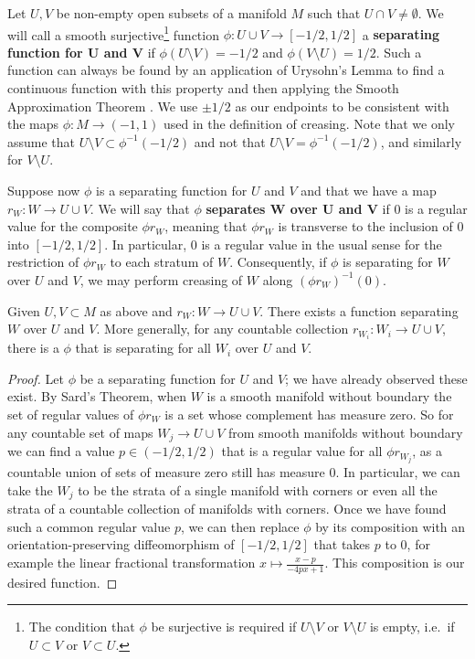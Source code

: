 \begin{definition}
	Let $U,V$ be non-empty open subsets of a manifold $M$ such that $U \cap V \neq \emptyset$.
	We will call a smooth surjective\footnote{The condition that $\phi$ be surjective is required if $U\setminus V$ or $V\setminus U$ is empty, i.e.\ if $U \subset V$ or $V \subset U$.} function $\phi \colon U \cup V \to [-1/2,1/2]$ a \textbf{separating function for $\mathbf U$ and $\mathbf V$} if $\phi(U\setminus V) = -1/2$ and $\phi(V\setminus U) = 1/2$.
	Such a function can always be found by an application of Urysohn's Lemma to find a continuous function with this property and then applying the Smooth Approximation Theorem \cite[Theorem III.2.5]{Kos93}.
	We use $\pm 1/2$ as our endpoints to be consistent with the maps $\phi \colon M \to (-1,1)$ used in the definition of creasing.
	Note that we only assume that $U \setminus V \subset \phi^{-1}(-1/2)$ and not that $U \setminus V  = \phi^{-1}(-1/2)$, and similarly for $V \setminus U$.

	Suppose now $\phi$ is a separating function for $U$ and $V$ and that we have a map $r_W \colon W \to U \cup V$.
	We will say that $\phi$ \textbf{separates $\mathbf W$ over $\mathbf U$ and $\mathbf V$} if $0$ is a regular value for the composite $\phi r_W$, meaning that $\phi r_W$ is transverse to the inclusion of $0$ into $[-1/2,1/2]$.
	In particular, $0$ is a regular value in the usual sense for the restriction of $\phi r_W$ to each stratum of $W$.
	Consequently, if $\phi$ is separating for $W$ over $U$ and $V$, we may perform creasing of $W$ along $(\phi r_W)^{-1}(0)$.
\end{definition}

\begin{lemma}\label{L: existence of separating}
	Given $U,V \subset M$ as above and $r_W \colon W \to U \cup V$.
	There exists a function separating $W$ over $U$ and $V$.
	More generally, for any countable collection $r_{W_i} \colon W_i \to U \cup V$, there is a $\phi$ that is separating for all $W_i$ over $U$ and $V$.
\end{lemma}

\begin{proof}
	Let $\phi$ be a separating function for $U$ and $V$; we have already observed these exist.
	By Sard's Theorem, when $W$ is a smooth manifold without boundary the set of regular values of $\phi r_W$ is a set whose complement has measure zero.
	So for any countable set of maps $W_j \to U \cup V$ from smooth manifolds without boundary we can find a value $p \in (-1/2, 1/2)$ that is a regular value for all $\phi r_{W_j}$, as a countable union of sets of measure zero still has measure $0$.
	In particular, we can take the $W_j$ to be the strata of a single manifold with corners or even all the strata of a countable collection of manifolds with corners.
    Once we have found such a common regular value $p$, we can then replace $\phi$ by its composition with an orientation-preserving diffeomorphism of $[-1/2,1/2]$ that takes $p$ to $0$, for example the linear fractional transformation $x \mapsto \frac{x-p}{-4px+1}$.
	This composition is our desired function.
\end{proof}


